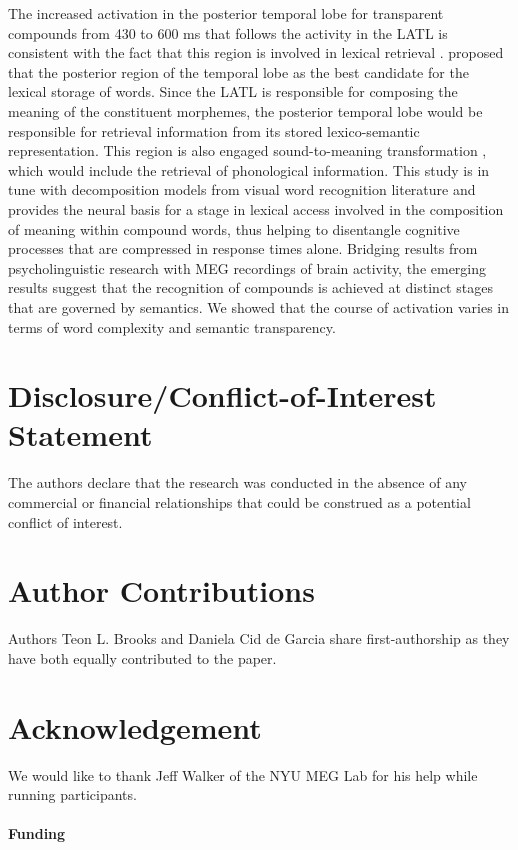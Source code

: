 \documentclass{frontiersSCNS}
\begin{document}
The increased activation in the posterior temporal lobe for transparent compounds from 430 to 600 ms that follows the activity in the LATL is consistent with the fact that this region is involved in lexical retrieval \citep*{Lau:2008, Hickok:2007}. \cite{Lau:2008} proposed that the posterior region of the temporal lobe as the best candidate for the lexical storage of words. Since the LATL is responsible for composing the meaning of the constituent morphemes, the posterior temporal lobe would be responsible for retrieval information from its stored lexico-semantic representation. This region is also engaged sound-to-meaning transformation \citep*{Binder:2000}, which would include the retrieval of phonological information. 
This study is in tune with decomposition models from visual word recognition literature and provides the neural basis for a stage in lexical access involved in the composition of meaning within compound words, thus helping to disentangle cognitive processes that are compressed in response times alone.  Bridging results from psycholinguistic research with MEG recordings of brain activity, the emerging results suggest that the recognition of compounds is achieved at distinct stages that are governed by semantics. We showed that the course of activation varies in terms of word complexity and semantic transparency. 

\section*{Disclosure/Conflict-of-Interest Statement}
The authors declare that the research was conducted in the absence of any commercial or financial relationships that could be construed as a potential conflict of interest.

\section*{Author Contributions}
Authors Teon L. Brooks and Daniela Cid de Garcia share first-authorship as they have both equally contributed to the paper.

\section*{Acknowledgement}
We would like to thank Jeff Walker of the NYU MEG Lab for his help while running participants.

\paragraph{Funding\textcolon} 		 	 	 		
					
\end{document}
